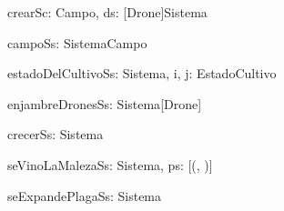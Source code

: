 \begin{problema}{crearS}{c: Campo, ds: [Drone]}{Sistema}
\end{problema}

\begin{problema}{campoS}{s: Sistema}{Campo}
\end{problema}

\begin{problema}{estadoDelCultivoS}{s: Sistema, i, j: \ent}{EstadoCultivo}
\end{problema}

\begin{problema}{enjambreDronesS}{s: Sistema}{[Drone]}
\end{problema}

\begin{problema}{crecerS}{s: Sistema}{}
\end{problema}

\begin{problema}{seVinoLaMalezaS}{s: Sistema, ps: [(\ent, \ent)]}{}
\end{problema}

\begin{problema}{seExpandePlagaS}{s: Sistema}{}

\end{problema}

